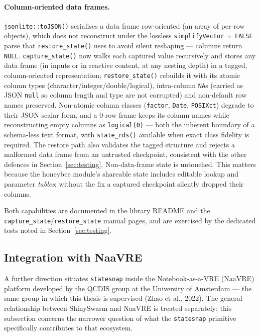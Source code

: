 \documentclass[11pt,a4paper]{article}
\begin{document}
\paragraph{Column-oriented data frames.} \texttt{jsonlite::toJSON()} serialises a
data frame row-oriented (an array of per-row objects), which does not reconstruct
under the lossless \texttt{simplifyVector = FALSE} parse that
\texttt{restore\_state()} uses to avoid silent reshaping --- columns return
\texttt{NULL}. \texttt{capture\_state()} now walks each captured value
recursively and stores any data frame (in inputs or in reactive content, at any
nesting depth) in a tagged, column-oriented representation;
\texttt{restore\_state()} rebuilds it with its atomic column types
(character/integer/double/logical), intra-column \texttt{NA}s (carried as JSON
\texttt{null} so column length and type are not corrupted) and non-default row
names preserved. Non-atomic column classes (\texttt{factor}, \texttt{Date},
\texttt{POSIXct}) degrade to their JSON scalar form, and a 0-row frame keeps its
column names while reconstructing empty columns as \texttt{logical(0)} --- both
the inherent boundary of a schema-less text format, with \texttt{state\_rds()}
available when exact class fidelity is required. The restore path also validates
the tagged structure and rejects a malformed data frame from an untrusted
checkpoint, consistent with the other defences in
Section~\ref{sec:testing}. Non-data-frame state is untouched. This matters
because the honeybee module's shareable state includes editable lookup and
parameter \emph{tables}; without the fix a captured checkpoint silently dropped
their columns.

Both capabilities are documented in the library README and the
\texttt{capture\_state}/\texttt{restore\_state} manual pages, and are exercised by
the dedicated tests noted in Section~\ref{sec:testing}.

\subsection{Integration with NaaVRE}

A further direction situates \texttt{statesnap} inside the Notebook-as-a-VRE
(NaaVRE) platform developed by the QCDIS group at the University of Amsterdam ---
the same group in which this thesis is supervised (Zhao et al., 2022). The
general relationship between ShinySwarm and NaaVRE is treated separately; this
subsection concerns the narrower question of what the \texttt{statesnap}
primitive specifically contributes to that ecosystem.
\end{document}
